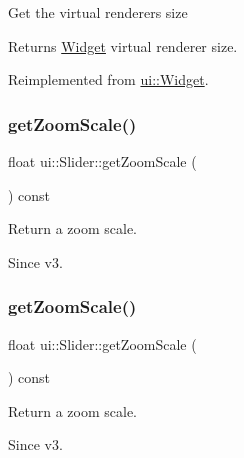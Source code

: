 Get the virtual renderer\textquotesingle{}s size \begin{DoxyReturn}{Returns}
\hyperlink{classui_1_1Widget}{Widget} virtual renderer size. 
\end{DoxyReturn}


Reimplemented from \hyperlink{classui_1_1Widget_a2ed0d41565593f78dc59c975d58a869e}{ui\+::\+Widget}.

\mbox{\label{classui_1_1Slider_abaeae39d3a0da8594d6e3a699c7a3ced}} 
\subsubsection{\texorpdfstring{get\+Zoom\+Scale()}{getZoomScale()}\hspace{0.1cm}{\footnotesize\ttfamily [1/2]}}
{\footnotesize\ttfamily float ui\+::\+Slider\+::get\+Zoom\+Scale (\begin{DoxyParamCaption}{ }\end{DoxyParamCaption}) const}



Return a zoom scale. 

\begin{DoxySince}{Since}
v3. 
\end{DoxySince}
\mbox{\label{classui_1_1Slider_abaeae39d3a0da8594d6e3a699c7a3ced}} 
\subsubsection{\texorpdfstring{get\+Zoom\+Scale()}{getZoomScale()}\hspace{0.1cm}{\footnotesize\ttfamily [2/2]}}
{\footnotesize\ttfamily float ui\+::\+Slider\+::get\+Zoom\+Scale (\begin{DoxyParamCaption}{ }\end{DoxyParamCaption}) const}



Return a zoom scale. 

\begin{DoxySince}{Since}
v3. 
\end{DoxySince}
\mbox{\label{classui_1_1Slider_a2b702f67e7e217bac4c618ed0fe36d7a}} 
